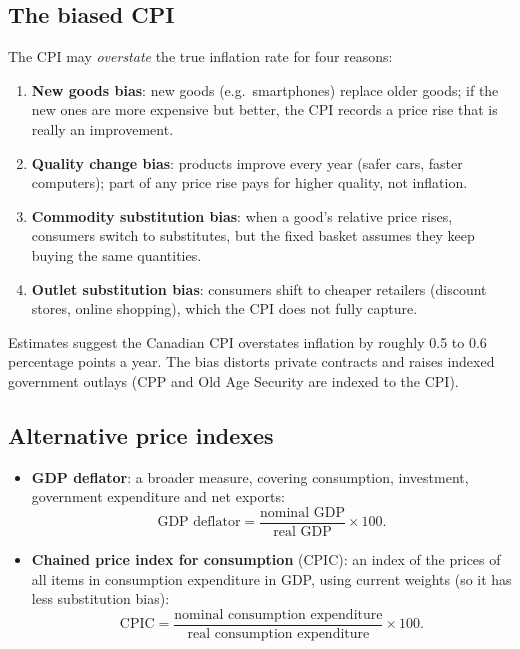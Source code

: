 \subsection{The biased CPI}

The CPI may \emph{overstate} the true inflation rate for four reasons:
\begin{enumerate}
  \item \textbf{New goods bias}: new goods (e.g.\ smartphones) replace older goods; if the
        new ones are more expensive but better, the CPI records a price rise that is really
        an improvement.
  \item \textbf{Quality change bias}: products improve every year (safer cars, faster
        computers); part of any price rise pays for higher quality, not inflation.
  \item \textbf{Commodity substitution bias}: when a good's relative price rises, consumers
        switch to substitutes, but the fixed basket assumes they keep buying the same
        quantities.
  \item \textbf{Outlet substitution bias}: consumers shift to cheaper retailers (discount
        stores, online shopping), which the CPI does not fully capture.
\end{enumerate}
Estimates suggest the Canadian CPI overstates inflation by roughly 0.5 to 0.6 percentage
points a year. The bias distorts private contracts and raises indexed government outlays
(CPP and Old Age Security are indexed to the CPI).

\subsection{Alternative price indexes}

\begin{itemize}
  \item \textbf{GDP deflator}: a broader measure, covering consumption, investment,
        government expenditure and net exports:
        \[
          \text{GDP deflator} = \frac{\text{nominal GDP}}{\text{real GDP}} \times 100.
        \]
  \item \textbf{Chained price index for consumption} (CPIC): an index of the prices of all
        items in consumption expenditure in GDP, using current weights (so it has less
        substitution bias):
        \[
          \text{CPIC} = \frac{\text{nominal consumption expenditure}}
          {\text{real consumption expenditure}} \times 100.
        \]
\end{itemize}

